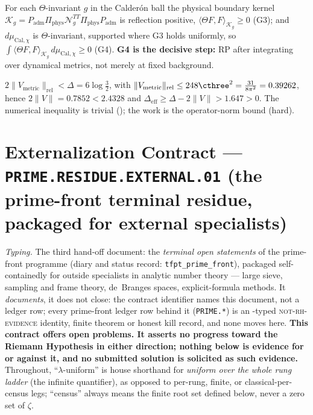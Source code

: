 \begin{lemma}
For each $\Theta$-invariant $g$ in the Calderón ball the physical boundary kernel
$\mathcal K_g=P_{\mathrm{adm}}\Pi_{\mathrm{phys}}\mathcal N_g^{TT}\Pi_{\mathrm{phys}}P_{\mathrm{adm}}$ is
reflection positive, $\langle\Theta F,F\rangle_{\mathcal K_g}\ge0$ (G3); and $d\mu_{\mathrm{Cal},\chi}$ is
$\Theta$-invariant, supported where G3 holds uniformly, so
$\int\langle\Theta F,F\rangle_{\mathcal K_g}\,d\mu_{\mathrm{Cal},\chi}\ge0$ (G4). \textbf{G4 is the decisive
step:} RP after integrating over dynamical metrics, not merely at fixed background.
\end{lemma}

\begin{lemma}
$2\|V_{\mathrm{metric}}\|_{\mathrm{rel}}<\Delta=6\log\tfrac32$, with
$\|V_{\mathrm{metric}}\|_{\mathrm{rel}}\le248\cthree^2=\tfrac{31}{8\pi^2}=0.39262$, hence
$2\|V\|=0.7852<2.4328$ and $\Delta_{\mathrm{eff}}\ge\Delta-2\|V\|>1.647>0$. The numerical inequality is
trivial (); the work is the operator-norm bound (hard).
\end{lemma}


\section*{Externalization Contract --- \texttt{PRIME.RESIDUE.EXTERNAL.01} (the prime-front terminal residue, packaged for external specialists)}
\noindent\emph{Typing.} The third hand-off document: the \emph{terminal open statements} of the
prime-front programme (diary and status record: \texttt{tfpt\_prime\_front}), packaged
self-containedly for outside specialists in analytic number theory --- large sieve, sampling and
frame theory, de~Branges spaces, explicit-formula methods.  It \emph{documents}, it does not
close: the contract identifier names this document, not a ledger row; every prime-front ledger
row behind it (\texttt{PRIME.*}) is an \mE-typed \textsc{not-rh-evidence} identity, finite
theorem or honest kill record, and none moves here.  \textbf{This contract offers open problems.
It asserts no progress toward the Riemann Hypothesis in either direction; nothing below is
evidence for or against it, and no submitted solution is solicited as such evidence.}
Throughout, ``$\lambda$-uniform'' is house shorthand for \emph{uniform over the whole rung
ladder} (the infinite quantifier), as opposed to per-rung, finite, or classical-per-census legs;
``census'' always means the finite root set defined below, never a zero set of $\zeta$.


